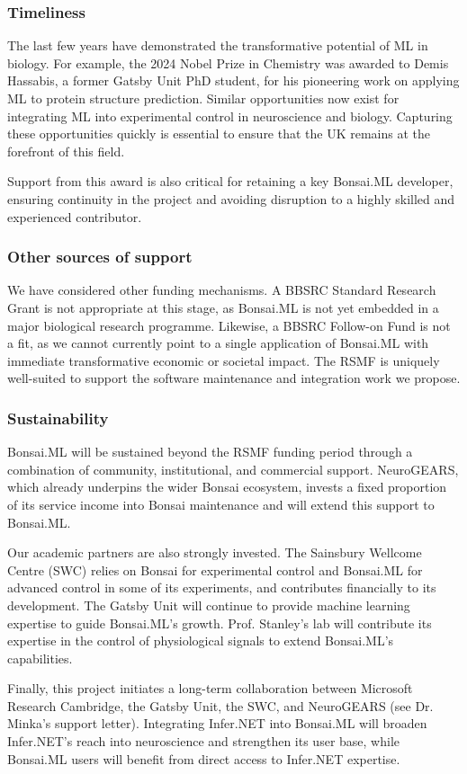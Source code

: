 \subsubsection*{Timeliness}

The last few years have demonstrated the transformative potential of ML in
biology. For example, the 2024 Nobel Prize in Chemistry was awarded to Demis
Hassabis, a former Gatsby Unit PhD student, for his pioneering work on applying
ML to protein structure prediction. Similar opportunities now exist for
integrating ML into experimental control in neuroscience and biology.
Capturing these opportunities quickly is essential to ensure that the UK
remains at the forefront of this field.

Support from this award is also critical for retaining a key Bonsai.ML
developer, ensuring continuity in the project and avoiding disruption to a
highly skilled and experienced contributor.

\subsubsection*{Other sources of support}

We have considered other funding mechanisms. A BBSRC Standard Research Grant is
not appropriate at this stage, as Bonsai.ML is not yet embedded in a major
biological research programme.
%
Likewise, a BBSRC Follow-on Fund is not a fit, as we cannot currently point to
a single application of Bonsai.ML with immediate transformative economic or
societal impact.
%
The RSMF is uniquely well-suited to support the software maintenance and
integration work we propose.

\subsubsection*{Sustainability}

Bonsai.ML will be sustained beyond the RSMF funding period through a
combination of community, institutional, and commercial support.
%
NeuroGEARS, which already underpins the wider Bonsai ecosystem, invests a fixed
proportion of its service income into Bonsai maintenance and will extend this
support to Bonsai.ML.

Our academic partners are also strongly invested.
%
The Sainsbury Wellcome Centre
(SWC) relies on Bonsai for experimental control and Bonsai.ML for advanced
control in some of its experiments, and contributes financially to its
development.
%
The Gatsby Unit will continue to provide machine learning
expertise to guide Bonsai.ML’s growth.
%
Prof. Stanley’s lab will contribute its expertise in the control of
physiological signals to extend Bonsai.ML’s capabilities.

Finally, this project initiates a long-term collaboration between Microsoft
Research Cambridge, the Gatsby Unit, the SWC, and NeuroGEARS (see Dr. Minka’s
support letter). Integrating Infer.NET into Bonsai.ML will broaden Infer.NET’s
reach into neuroscience and strengthen its user base, while Bonsai.ML users
will benefit from direct access to Infer.NET expertise.
